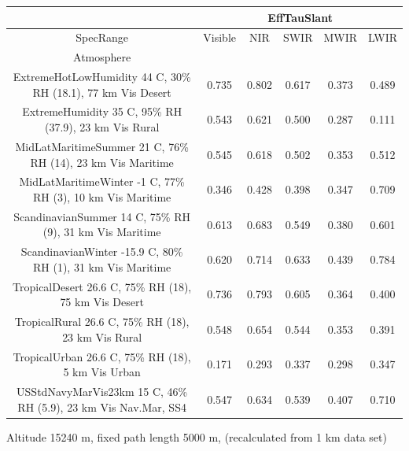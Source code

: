 \documentclass{workpackage}
\begin{document}
\begin{center}

\begin{footnotesize}

\begin{tabular}{|c|c|c|c|c|c|}
\hline
&\multicolumn{5}{|c|}{EffTauSlant}\\\hline
SpecRange&Visible&NIR&SWIR&MWIR&LWIR\\\hline
Atmosphere&&&&&\\\hline
ExtremeHotLowHumidity 44 C, 30\% RH (18.1), 77 km Vis Desert&0.735&0.802&0.617&0.373&0.489\\\hline
ExtremeHumidity 35 C, 95\% RH (37.9), 23 km Vis Rural&0.543&0.621&0.500&0.287&0.111\\\hline
MidLatMaritimeSummer 21 C, 76\% RH (14), 23 km Vis Maritime&0.545&0.618&0.502&0.353&0.512\\\hline
MidLatMaritimeWinter -1 C, 77\% RH (3), 10 km Vis Maritime&0.346&0.428&0.398&0.347&0.709\\\hline
ScandinavianSummer 14 C, 75\% RH (9), 31 km Vis Maritime&0.613&0.683&0.549&0.380&0.601\\\hline
ScandinavianWinter -15.9 C, 80\% RH (1), 31 km Vis Maritime&0.620&0.714&0.633&0.439&0.784\\\hline
TropicalDesert 26.6 C, 75\% RH (18), 75 km Vis Desert&0.736&0.793&0.605&0.364&0.400\\\hline
TropicalRural 26.6 C, 75\% RH (18), 23 km Vis Rural&0.548&0.654&0.544&0.353&0.391\\\hline
TropicalUrban 26.6 C, 75\% RH (18), 5 km Vis Urban&0.171&0.293&0.337&0.298&0.347\\\hline
USStdNavyMarVis23km 15 C, 46\% RH (5.9), 23 km Vis Nav.Mar, SS4&0.547&0.634&0.539&0.407&0.710\\\hline

\end{tabular}
\end{footnotesize}
\end{center}

Altitude 15240 m, fixed path length 5000 m, (recalculated from 1 km data set)
\end{document}
